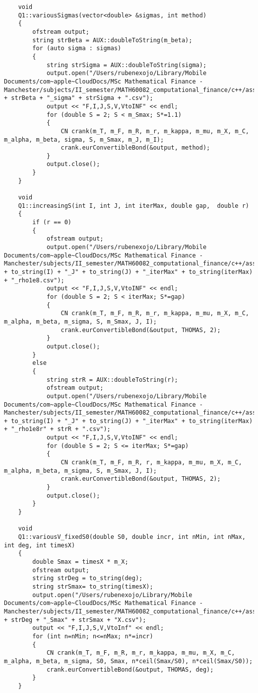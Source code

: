 \begin{lstlisting}
	void
	Q1::variousSigmas(vector<double> &sigmas, int method)
	{
		ofstream output;
		string strBeta = AUX::doubleToString(m_beta);
		for (auto sigma : sigmas)
		{
			string strSigma = AUX::doubleToString(sigma);
			output.open("/Users/rubenexojo/Library/Mobile Documents/com~apple~CloudDocs/MSc Mathematical Finance - Manchester/subjects/II_semester/MATH60082_computational_finance/c++/assignment2/data/task1/eurConvBondValues_beta" + strBeta + "_sigma" + strSigma + ".csv");
			output << "F,I,J,S,V,VtoINF" << endl;
			for (double S = 2; S < m_Smax; S*=1.1)
			{
				CN crank(m_T, m_F, m_R, m_r, m_kappa, m_mu, m_X, m_C, m_alpha, m_beta, sigma, S, m_Smax, m_J, m_I);
				crank.eurConvertibleBond(&output, method);
			}
			output.close();
		}
	}
	
	void
	Q1::increasingS(int I, int J, int iterMax, double gap,  double r)
	{
		if (r == 0)
		{
			ofstream output;
			output.open("/Users/rubenexojo/Library/Mobile Documents/com~apple~CloudDocs/MSc Mathematical Finance - Manchester/subjects/II_semester/MATH60082_computational_finance/c++/assignment2/data/task1/eurConvBondValues_I" + to_string(I) + "_J" + to_string(J) + "_iterMax" + to_string(iterMax) + "_rho1e8.csv");
			output << "F,I,J,S,V,VtoINF" << endl;
			for (double S = 2; S < iterMax; S*=gap)
			{
				CN crank(m_T, m_F, m_R, m_r, m_kappa, m_mu, m_X, m_C, m_alpha, m_beta, m_sigma, S, m_Smax, J, I);
				crank.eurConvertibleBond(&output, THOMAS, 2);
			}
			output.close();
		}
		else
		{
			string strR = AUX::doubleToString(r);
			ofstream output;
			output.open("/Users/rubenexojo/Library/Mobile Documents/com~apple~CloudDocs/MSc Mathematical Finance - Manchester/subjects/II_semester/MATH60082_computational_finance/c++/assignment2/data/task1/eurConvBondValues_I" + to_string(I) + "_J" + to_string(J) + "_iterMax" + to_string(iterMax) + "_rho1e8r" + strR + ".csv");
			output << "F,I,J,S,V,VtoINF" << endl;
			for (double S = 2; S <= iterMax; S*=gap)
			{
				CN crank(m_T, m_F, m_R, r, m_kappa, m_mu, m_X, m_C, m_alpha, m_beta, m_sigma, S, m_Smax, J, I);
				crank.eurConvertibleBond(&output, THOMAS, 2);
			}
			output.close();
		}
	}
	
	void
	Q1::variousV_fixedS0(double S0, double incr, int nMin, int nMax, int deg, int timesX)
	{
		double Smax = timesX * m_X;
		ofstream output;
		string strDeg = to_string(deg);
		string strSmax= to_string(timesX);
		output.open("/Users/rubenexojo/Library/Mobile Documents/com~apple~CloudDocs/MSc Mathematical Finance - Manchester/subjects/II_semester/MATH60082_computational_finance/c++/assignment2/data/task1/eurConvBondValues_increasing_iMax_and_jMax_deg" + strDeg + "_Smax" + strSmax + "X.csv");
		output << "F,I,J,S,V,VtoInf" << endl;
		for (int n=nMin; n<=nMax; n*=incr)
		{
			CN crank(m_T, m_F, m_R, m_r, m_kappa, m_mu, m_X, m_C, m_alpha, m_beta, m_sigma, S0, Smax, n*ceil(Smax/S0), n*ceil(Smax/S0));
			crank.eurConvertibleBond(&output, THOMAS, deg);
		}
	}
	

\end{lstlisting}
